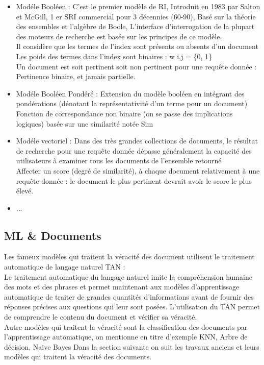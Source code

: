 \documentclass[12pt]{report}
\begin{document}
\begin{itemize}
\item Modéle Booléen : C’est le premier modèle de RI,
Introduit en 1983 par Salton et McGill, 1 er SRI commercial pour 3 décennies (60-90), Basé sur la théorie des ensembles et l’algèbre de Boole, L’interface d’interrogation de la plupart des moteurs de
recherche est basée sur les principes de ce modèle.\\
Il considère que les termes de l’index sont présents ou
absents d’un document\\
Les poids des termes dans l’index sont binaires : w i,j = \{0, 1\}\\
Un document est soit pertinent soit non pertinent pour une
requête donnée : Pertinence binaire, et jamais partielle.

\item Modéle Booléen Pondéré : Extension du modèle booléen en intégrant des
pondérations (dénotant la représentativité d’un terme
pour un document) \\
Fonction de correspondance non binaire (on se passe des
implications logiques) basée sur une similarité notée Sim

\item Modéle vectoriel : Dans des très grandes collections de documents, le
résultat de recherche pour une requête donnée dépasse
généralement la capacité des utilisateurs à examiner tous
les documents de l’ensemble retourné\\ Affecter un score (degré de similarité), à chaque document
relativement à une requête donnée : le document le plus
pertinent devrait avoir le score le plus élevé.
\item ...
\end{itemize}
\subsection{ML \& Documents}
Les fameux modèles qui traitent la véracité des document utilisent le traitement automatique de langage naturel TAN :\\ Le traitement automatique du langage naturel imite la compréhension
humaine des mots et des phrases et permet maintenant aux modèles
d'apprentissage automatique de traiter de grandes quantités d'informations
avant de fournir des réponses précises aux questions qui leur sont posées.
L'utilisation du TAN permet de comprendre le contenu du document et vérifier sa véracité.
\\Autre modèles qui traitent la véracité sont la classification des documents par l'apprentissage automatique, on mentionne en titre d'exemple KNN, Arbre de décision, Naive Bayes
Dans la section suivante on suit les travaux anciens et leurs modèles qui traitent la véracité des documents.
\end{document}
